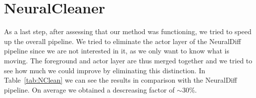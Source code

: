 \section{NeuralCleaner}
As a last step, after assessing that our method was functioning, we tried to speed up the overall pipeline.
We tried to eliminate the actor layer of the NeuralDiff pipeline since we are not interested in it, as we 
only want to know what is moving. The foreground and actor layer are thus merged together and we tried to see
how much we could improve by eliminating this distinction. In Table~\ref{tab:NClean} we can see the results in comparison with
the NeuralDiff pipeline. On average we obtained a descreasing factor of $\sim30\%$.



